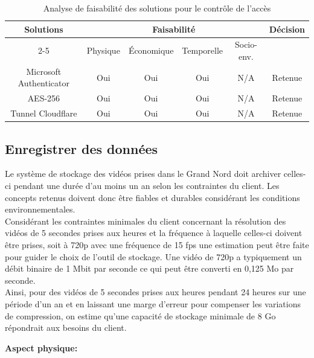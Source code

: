 \begin{table}[H]
    \centering
\begin{tabular}{|c|c|c|c|c|c|}
    \hline
    \centering
    \textbf{Solutions} & \multicolumn{4}{c|}{Faisabilité} & \textbf{Décision} \\
    \cline{2-5}
    & Physique & Économique & Temporelle & Socio-env. & \\
    \hline
    Microsoft Authenticator & Oui & Oui & Oui & N/A & Retenue \\
    \hline
    AES-256 & Oui & Oui & Oui & N/A & Retenue \\
    \hline
    Tunnel Cloudflare & Oui & Oui & Oui & N/A & Retenue \\
    \hline
\end{tabular}
\caption{Analyse de faisabilité des solutions pour le contrôle de l'accès}
\label{tab:faisabiliteAccès}
\end{table}


\subsection{Enregistrer des données}
\label{EnregistrerDesDonnées}

Le système de stockage des vidéos prises dans le Grand Nord doit archiver celles-ci pendant une durée d’au moins un an selon les contraintes du client. Les concepts retenus doivent donc être fiables et durables considérant les conditions environnementales. 
\\

Considérant les contraintes minimales du client concernant la résolution des vidéos de 5 secondes prises aux heures et la fréquence à laquelle celles-ci doivent être prises, soit à 720p avec une fréquence de 15 fps une estimation peut être faite pour guider le choix de l'outil de stockage. Une vidéo de 720p a typiquement un débit binaire de 1 Mbit par seconde ce qui peut être converti en 0,125 Mo par seconde. 
\\

Ainsi, pour des vidéos de 5 secondes prises aux heures pendant 24 heures sur une période d’un an et en laissant une marge d’erreur pour compenser les variations de compression, on estime qu’une capacité de stockage minimale de 8 Go répondrait aux besoins du client.
\bigskip

\noindent\textbf{Aspect physique:}

